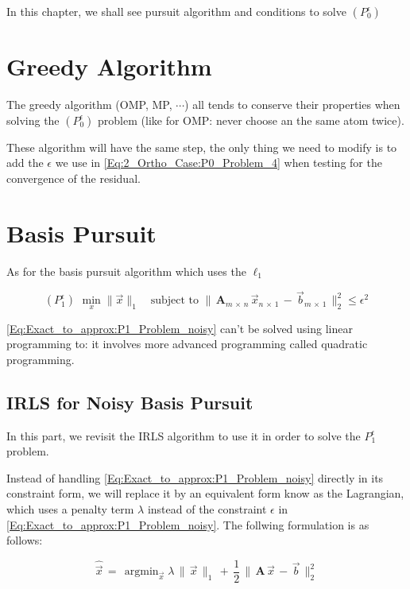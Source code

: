 \documentclass[12pt,a4paper]{book}
\DeclareMathOperator*{\argmin}{argmin}
\begin{document}
In this chapter, we shall see pursuit algorithm and conditions to solve $(P_0^{\epsilon})$


\section{Greedy Algorithm}

The greedy algorithm (OMP, MP, $\cdots$) all tends to conserve their properties when solving the $(P_0^{\epsilon})$ problem (like for OMP: never choose an the same atom twice).

These algorithm will have the same step, the only thing we need to modify is to add the $\epsilon$ we use in \autoref{Eq:2_Ortho_Case:P0_Problem_4} when testing for the convergence of the residual.\\

\newpage
\section{Basis Pursuit}

As for the basis pursuit algorithm which uses the $\ell_1 ~$ 

\begin{equation}
(P_1^{\epsilon}) \, \,   \min_x \lVert \vec{x} \rVert_1 \quad \text{subject to }  \lVert \, \boldsymbol A_{m \, \times \, n} \, \Vec{x}_{n \, \times \, 1} \, - \, \Vec{b}_{m \, \times \, 1} \, \rVert_2^2 \leq \epsilon^2
\label{Eq:Exact_to_approx:P1_Problem_noisy}
\end{equation}

\autoref{Eq:Exact_to_approx:P1_Problem_noisy} can't be solved using linear programming to: it involves more advanced programming called quadratic programming.


\subsection{IRLS for Noisy Basis Pursuit}

In this part, we revisit the IRLS algorithm to use it in order to solve the $P_1^{\epsilon}$ problem. 

Instead of handling \autoref{Eq:Exact_to_approx:P1_Problem_noisy} directly in its constraint form, we will replace it by an equivalent form know as the Lagrangian, which uses a penalty term $\lambda$ instead of the constraint $\epsilon$ in \autoref{Eq:Exact_to_approx:P1_Problem_noisy}. The follwing formulation is as follows:

\begin{equation}
\hat{\vec{x}} \, = \, \argmin_{\vec{x}} \lambda \, \lVert \,  \vec{x} \, \rVert_1 \, + \, \displaystyle\frac{1}{2} \, \lVert \, \boldsymbol A \, \vec{x} \, - \, \vec{b} \, \rVert_2^2 
\label{Eq:Exact_to_approx:P1_Problem_noisy_lagrangian}
\end{equation}
\end{document}
